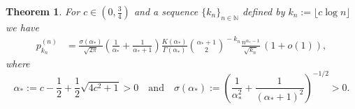 \documentclass[11pt,a4paper]{article}
\numberwithin{equation}{section}
\newtheorem {theorem}{Theorem}[section]
\def\NN{\mathbb{N}}
\begin{document}
\begin{theorem}\label{thm:saddle}
    For $c\in(0,\frac{3}{4})$ and a sequence $\{k_n\}_{n\in\NN}$ defined by $k_n:=\lfloor c\log n\rfloor$ we have
    \begin{align*}
        p_{k_n}^{(n)} &= \frac{\sigma(\alpha_*)}{\sqrt{2\pi}} \left(\frac{1}{\alpha_*} + \frac{1}{\alpha_*+1}\right) \frac{K(\alpha_*)}{\Gamma(\alpha_*)} \binom{\alpha_*+1}{2}^{\!\!-k_n} 
            \frac{n^{\alpha_*-1}}{\sqrt{k_n}}\, (1+o(1)),
    \end{align*}
    where 
    \begin{equation*}
        \alpha_* := c-\frac{1}{2} + \frac{1}{2} \sqrt{4c^2+1}>0 \quad \text{and} \quad
        \sigma(\alpha_*) := \left(\frac{1}{\alpha_*^2} + \frac{1}{(\alpha_*+1)^2}\right)^{-1/2}>0.
    \end{equation*}
\end{theorem}
\end{document}
